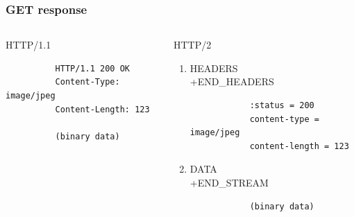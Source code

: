 \documentclass[lualatex]{beamer}
\begin{document}
\begin{frame}[fragile]
  \frametitle{GET response}

  \begin{columns}[t]
    \begin{column}{.45\textwidth}
      \begin{block}{HTTP/1.1}
        \begin{verbatim}
          HTTP/1.1 200 OK
          Content-Type: image/jpeg
          Content-Length: 123
          
          (binary data)
        \end{verbatim}
      \end{block}
    \end{column}
    \begin{column}{0.45\textwidth}
      \begin{block}{HTTP/2}
        \begin{enumerate}
        \item HEADERS\\+END\_HEADERS
          \begin{verbatim}
            :status = 200
            content-type = image/jpeg
            content-length = 123
          \end{verbatim}
        \item DATA\\+END\_STREAM
          \begin{verbatim}
            (binary data)
          \end{verbatim}
        \end{enumerate}
      \end{block}
    \end{column}
  \end{columns}
\end{frame}
\end{document}
